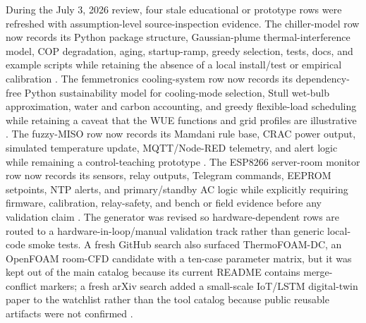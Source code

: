 \documentclass[11pt]{article}
\begin{document}
During the July 3, 2026 review, four stale educational or prototype rows were refreshed with assumption-level source-inspection evidence. The chiller-model row now records its Python package structure, Gaussian-plume thermal-interference model, COP degradation, aging, startup-ramp, greedy selection, tests, docs, and example scripts while retaining the absence of a local install/test or empirical calibration \cite{ME421ChillerModel2026}. The femmetronics cooling-system row now records its dependency-free Python sustainability model for cooling-mode selection, Stull wet-bulb approximation, water and carbon accounting, and greedy flexible-load scheduling while retaining a caveat that the WUE functions and grid profiles are illustrative \cite{FemmetronicsCoolingSystem2026}. The fuzzy-MISO row now records its Mamdani rule base, CRAC power output, simulated temperature update, MQTT/Node-RED telemetry, and alert logic while remaining a control-teaching prototype \cite{D1D104FuzzyMISO2026}. The ESP8266 server-room monitor row now records its sensors, relay outputs, Telegram commands, EEPROM setpoints, NTP alerts, and primary/standby AC logic while explicitly requiring firmware, calibration, relay-safety, and bench or field evidence before any validation claim \cite{SohelSmartIoTCooling2026}. The generator was revised so hardware-dependent rows are routed to a hardware-in-loop/manual validation track rather than generic local-code smoke tests. A fresh GitHub search also surfaced ThermoFOAM-DC, an OpenFOAM room-CFD candidate with a ten-case parameter matrix, but it was kept out of the main catalog because its current README contains merge-conflict markers; a fresh arXiv search added a small-scale IoT/LSTM digital-twin paper to the watchlist rather than the tool catalog because public reusable artifacts were not confirmed \cite{ThermoFOAMDC2026,GoncalvesScalableTwin2026}.
\end{document}
